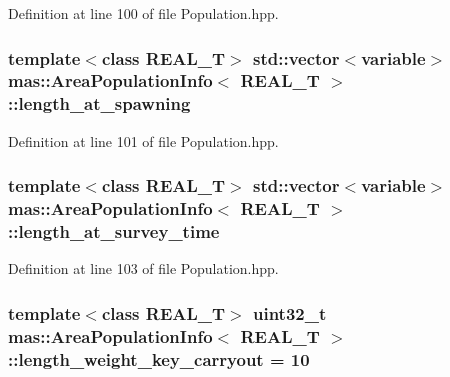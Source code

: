 Definition at line 100 of file Population.\-hpp.

\hypertarget{structmas_1_1_area_population_info_ae61079bdeee2f985c3ec234a33e7c146}{
\subsubsection[{length\-\_\-at\-\_\-spawning}]{\setlength{\rightskip}{0pt plus 5cm}template$<$class R\-E\-A\-L\-\_\-\-T$>$ std\-::vector$<${\bf variable}$>$ {\bf mas\-::\-Area\-Population\-Info}$<$ R\-E\-A\-L\-\_\-\-T $>$\-::length\-\_\-at\-\_\-spawning}}\label{structmas_1_1_area_population_info_ae61079bdeee2f985c3ec234a33e7c146}


Definition at line 101 of file Population.\-hpp.

\hypertarget{structmas_1_1_area_population_info_ae8102e517c90423dcf087083da3125e5}{
\subsubsection[{length\-\_\-at\-\_\-survey\-\_\-time}]{\setlength{\rightskip}{0pt plus 5cm}template$<$class R\-E\-A\-L\-\_\-\-T$>$ std\-::vector$<${\bf variable}$>$ {\bf mas\-::\-Area\-Population\-Info}$<$ R\-E\-A\-L\-\_\-\-T $>$\-::length\-\_\-at\-\_\-survey\-\_\-time}}\label{structmas_1_1_area_population_info_ae8102e517c90423dcf087083da3125e5}


Definition at line 103 of file Population.\-hpp.

\hypertarget{structmas_1_1_area_population_info_af68d37d923cc8de6d425900490f6e105}{
\subsubsection[{length\-\_\-weight\-\_\-key\-\_\-carryout}]{\setlength{\rightskip}{0pt plus 5cm}template$<$class R\-E\-A\-L\-\_\-\-T$>$ uint32\-\_\-t {\bf mas\-::\-Area\-Population\-Info}$<$ R\-E\-A\-L\-\_\-\-T $>$\-::length\-\_\-weight\-\_\-key\-\_\-carryout = 10\hspace{0.3cm}{\ttfamily [static]}}}\label{structmas_1_1_area_population_info_af68d37d923cc8de6d425900490f6e105}


